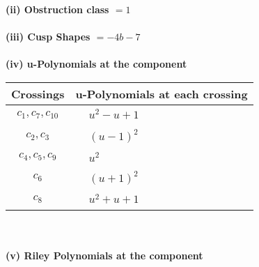 \documentclass[1p]{elsarticle_modified}
\theoremstyle{definition}
\begin{document}
\flushleft \textbf{(ii) Obstruction class $= 1$}\\~\\
\flushleft \textbf{(iii) Cusp Shapes $= -4 b-7$}\\~\\
\newpage\renewcommand{\arraystretch}{1}
\flushleft \textbf{(iv) u-Polynomials at the component}\newline \\
\begin{tabular}{m{50pt}|m{274pt}}
Crossings & \hspace{64pt}u-Polynomials at each crossing \\
\hline $$\begin{aligned}c_{1},c_{7},c_{10}\end{aligned}$$&$\begin{aligned}
&u^2- u+1
\end{aligned}$\\
\hline $$\begin{aligned}c_{2},c_{3}\end{aligned}$$&$\begin{aligned}
&(u-1)^2
\end{aligned}$\\
\hline $$\begin{aligned}c_{4},c_{5},c_{9}\end{aligned}$$&$\begin{aligned}
&u^2
\end{aligned}$\\
\hline $$\begin{aligned}c_{6}\end{aligned}$$&$\begin{aligned}
&(u+1)^2
\end{aligned}$\\
\hline $$\begin{aligned}c_{8}\end{aligned}$$&$\begin{aligned}
&u^2+u+1
\end{aligned}$\\
\hline
\end{tabular}\\~\\
\newpage\renewcommand{\arraystretch}{1}
\flushleft \textbf{(v) Riley Polynomials at the component}\newline \\
\end{document}
